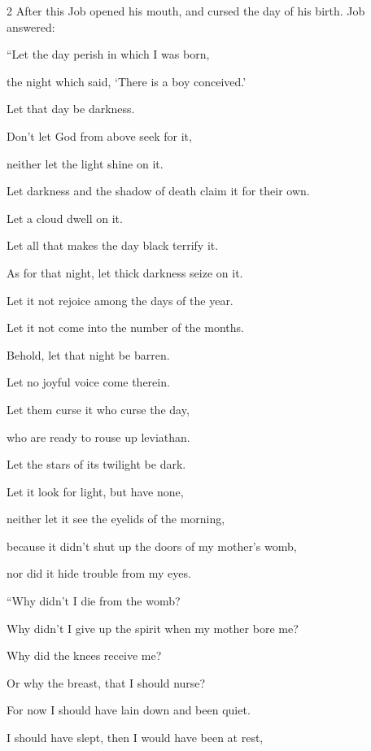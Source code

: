 \begin{multicols}{2}
	\mychapter{} \myverse*{}After this Job opened his mouth, and cursed the day of his birth.
	\myverse{}Job answered:
	
	\myverse{}“Let the day perish in which I was born,
	
	the night which said, ‘There is a boy conceived.’
	
	\myverse{}Let that day be darkness.
	
	Don’t let God from above seek for it,
	
	neither let the light shine on it.
	
	\myverse{}Let darkness and the shadow of death claim it for their own.
	
	Let a cloud dwell on it.
	
	Let all that makes the day black terrify it.
	
	\myverse{}As for that night, let thick darkness seize on it.
	
	Let it not rejoice among the days of the year.
	
	Let it not come into the number of the months.
	
	\myverse{}Behold, let that night be barren.
	
	Let no joyful voice come therein.
	
	\myverse{}Let them curse it who curse the day,
	
	who are ready to rouse up leviathan.
	
	\myverse{}Let the stars of its twilight be dark.
	
	Let it look for light, but have none,
	
	neither let it see the eyelids of the morning,
	
	\myverse{}because it didn’t shut up the doors of my mother’s womb,
	
	nor did it hide trouble from my eyes.
	
	\vspace{\baselineskip}
	
	\myverse{}“Why didn’t I die from the womb?
	
	Why didn’t I give up the spirit when my mother bore me?
	
	\myverse{}Why did the knees receive me?
	
	Or why the breast, that I should nurse?
	
	\myverse{}For now I should have lain down and been quiet.
	
	I should have slept, then I would have been at rest,
	

\end{multicols}

